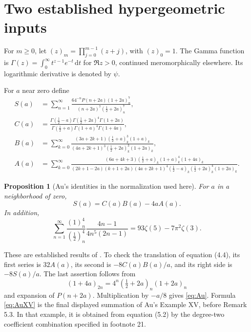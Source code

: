 \documentclass[11pt]{article}
\newtheorem{proposition}[theorem]{Proposition}
\newcommand{\dd}{\,\mathrm{d}}
\begin{document}
\section{Two established hypergeometric inputs}
For $m\geq0$, let $(z)_m=\prod_{j=0}^{m-1}(z+j)$, with $(z)_0=1$.
The Gamma function is $\Gamma(z)=\int_0^{\infty}t^{z-1}e^{-t}\dd t$
for $\Re z>0$, continued meromorphically elsewhere. Its logarithmic
derivative is denoted by $\psi$.

For $a$ near zero define
\begin{align}
 S(a)&=\sum_{n=1}^{\infty}
 \frac{64^{-n}P(n+2a)(1+2a)_n^7}
 {(n+2a)^7(\tfrac12+2a)_n^7},\label{eq:S}\\
 C(a)&=\frac{\Gamma(\tfrac12-a)\Gamma(\tfrac12+2a)^4\Gamma(1+2a)}
 {\Gamma(\tfrac12+a)\Gamma(1+a)^4\Gamma(1+4a)},\label{eq:C}\\
 B(a)&=\sum_{k=0}^{\infty}
 \frac{(3a+2k+1)(\tfrac12+a)_k^3(1+a)_k}
 {(4a+2k+1)^3(\tfrac12+2a)_k^3(1+2a)_k},\label{eq:B}\\
 A(a)&=\sum_{k=0}^{\infty}
 \frac{(6a+4k+3)(\tfrac12+a)_k(1+a)_k^4(1+4a)_k}
 {(2k+1-2a)(k+1+2a)(4a+2k+1)^4
 (\tfrac12-a)_k(\tfrac12+2a)_k^4(1+2a)_k}.
 \label{eq:A}
\end{align}

\begin{proposition}[Au's identities in the normalization used here]
For $a$ in a neighborhood of zero,
\begin{equation}\label{eq:Au}
 S(a)=C(a)B(a)-4aA(a).
\end{equation}
In addition,
\begin{equation}\label{eq:AuXV}
 \sum_{n=1}^{\infty}
 \frac{(1)_n^4}{(\tfrac12)_n^4}
 \frac{4n-1}{4n^5(2n-1)}
 =93\zeta(5)-7\pi^2\zeta(3).
\end{equation}
\end{proposition}

These are established results of \cite{Au}.
To check the translation of equation (4.4), its first series is
$32A(a)$, its second is $-8C(a)B(a)/a$, and its right side is
$-8S(a)/a$. The last assertion follows from
\begin{equation}\label{eq:dup}
 (1+4a)_{2n}=4^n(\tfrac12+2a)_n(1+2a)_n
\end{equation}
and expansion of $P(n+2a)$. Multiplication by $-a/8$ gives
\eqref{eq:Au}. Formula \eqref{eq:AuXV} is the final displayed summation
of Au's Example XV, before Remark 5.3. In that example, it is obtained
from equation (5.2) by the degree-two coefficient combination specified
in footnote 21.
\end{document}
